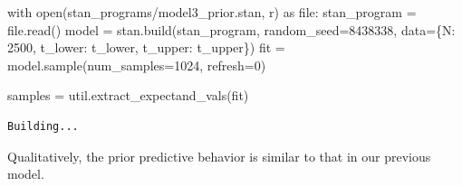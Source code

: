 \documentclass[
  letterpaper,
  DIV=11,
  numbers=noendperiod]{scrartcl}
\newenvironment{Shaded}{\begin{snugshade}}{\end{snugshade}}
\newcommand{\BuiltInTok}[1]{\textcolor[rgb]{0.00,0.23,0.31}{#1}}
\newcommand{\ControlFlowTok}[1]{\textcolor[rgb]{0.00,0.23,0.31}{#1}}
\newcommand{\DecValTok}[1]{\textcolor[rgb]{0.68,0.00,0.00}{#1}}
\newcommand{\ImportTok}[1]{\textcolor[rgb]{0.00,0.46,0.62}{#1}}
\newcommand{\NormalTok}[1]{\textcolor[rgb]{0.00,0.23,0.31}{#1}}
\newcommand{\OperatorTok}[1]{\textcolor[rgb]{0.37,0.37,0.37}{#1}}
\newcommand{\StringTok}[1]{\textcolor[rgb]{0.13,0.47,0.30}{#1}}
\begin{document}
\begin{Shaded}
\begin{Highlighting}[]
\ControlFlowTok{with} \BuiltInTok{open}\NormalTok{(}\StringTok{\textquotesingle{}stan\_programs/model3\_prior.stan\textquotesingle{}}\NormalTok{, }\StringTok{\textquotesingle{}r\textquotesingle{}}\NormalTok{) }\ImportTok{as} \BuiltInTok{file}\NormalTok{:}
\NormalTok{  stan\_program }\OperatorTok{=} \BuiltInTok{file}\NormalTok{.read()}
\NormalTok{model }\OperatorTok{=}\NormalTok{ stan.build(stan\_program,}
\NormalTok{                   random\_seed}\OperatorTok{=}\DecValTok{8438338}\NormalTok{,}
\NormalTok{                   data}\OperatorTok{=}\NormalTok{\{}\StringTok{\textquotesingle{}N\textquotesingle{}}\NormalTok{: }\DecValTok{2500}\NormalTok{,}
                         \StringTok{\textquotesingle{}t\_lower\textquotesingle{}}\NormalTok{: t\_lower,}
                         \StringTok{\textquotesingle{}t\_upper\textquotesingle{}}\NormalTok{: t\_upper\})}
\NormalTok{fit }\OperatorTok{=}\NormalTok{ model.sample(num\_samples}\OperatorTok{=}\DecValTok{1024}\NormalTok{, refresh}\OperatorTok{=}\DecValTok{0}\NormalTok{)}

\NormalTok{samples }\OperatorTok{=}\NormalTok{ util.extract\_expectand\_vals(fit)}
\end{Highlighting}
\end{Shaded}

\begin{verbatim}
Building...
\end{verbatim}

Qualitatively, the prior predictive behavior is similar to that in our
previous model.
\end{document}
